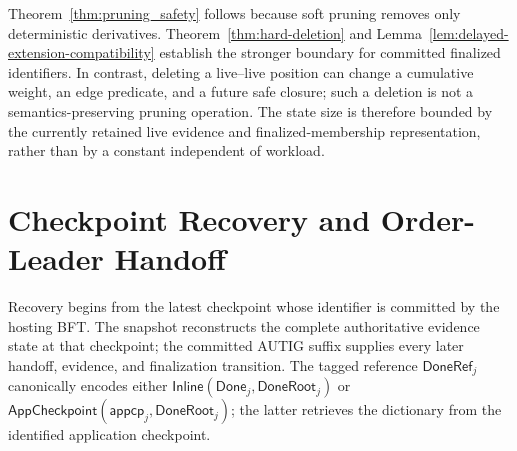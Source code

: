 Theorem~\ref{thm:pruning_safety} follows because soft pruning removes only
deterministic derivatives.  Theorem~\ref{thm:hard-deletion} and
Lemma~\ref{lem:delayed-extension-compatibility} establish the stronger boundary
for committed finalized identifiers.  In contrast, deleting a live--live
position can change a cumulative weight, an edge predicate, and a future safe
closure; such a deletion is not a semantics-preserving pruning operation.
The state size is therefore bounded by the currently retained live evidence
and finalized-membership representation, rather than by a constant independent
of workload.

\section{Checkpoint Recovery and Order-Leader Handoff}
\label{app:checkpoint-handoff}

Recovery begins from the latest checkpoint whose identifier is committed by
the hosting BFT.  The snapshot reconstructs the complete authoritative
evidence state at that checkpoint; the committed AUTIG suffix supplies every
later handoff, evidence, and finalization transition.  The tagged reference
$\mathsf{DoneRef}_j$ canonically encodes either
$\mathsf{Inline}(\mathsf{Done}_j,\mathsf{DoneRoot}_j)$ or
$\mathsf{AppCheckpoint}(\mathsf{appcp}_j,\mathsf{DoneRoot}_j)$; the latter
retrieves the dictionary from the identified application checkpoint.

